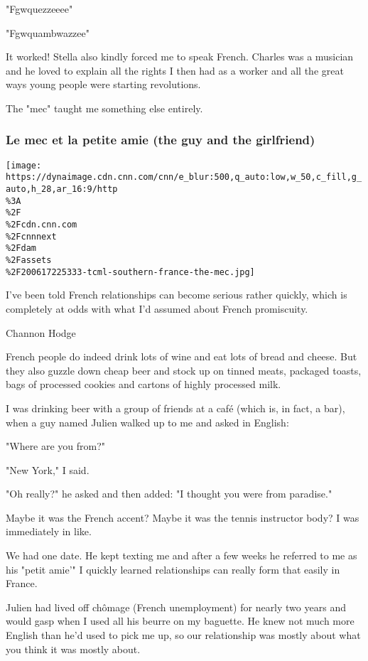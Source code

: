 "Fgwquezzeeee"

"Fgwquambwazzee"

It worked! Stella also kindly forced me to speak French. Charles was a
musician and he loved to explain all the rights I then had as a worker
and all the great ways young people were starting revolutions.

The "mec" taught me something else entirely.

\hypertarget{le-mec-et-la-petite-amie-the-guy-and-the-girlfriend}{%
\subsubsection{Le mec et la petite amie (the guy and the
girlfriend)}\label{le-mec-et-la-petite-amie-the-guy-and-the-girlfriend}}

\texttt{[image: https://dynaimage.cdn.cnn.com/cnn/e\_blur:500,q\_auto:low,w\_50,c\_fill,g\_auto,h\_28,ar\_16:9/http\\\%3A\\\%2F\\\%2Fcdn.cnn.com\\\%2Fcnnnext\\\%2Fdam\\\%2Fassets\\\%2F200617225333-tcml-southern-france-the-mec.jpg]}

I've been told French relationships can become serious rather quickly,
which is completely at odds with what I'd assumed about French
promiscuity.

Channon Hodge

French people do indeed drink lots of wine and eat lots of bread and
cheese. But they also guzzle down cheap beer and stock up on tinned
meats, packaged toasts, bags of processed cookies and cartons of highly
processed milk.

I was drinking beer with a group of friends at a café (which is, in
fact, a bar), when a guy named Julien walked up to me and asked in
English:

"Where are you from?"

"New York," I said.

"Oh really?" he asked and then added: "I thought you were from
paradise."

Maybe it was the French accent? Maybe it was the tennis instructor body?
I was immediately in like.

We had one date. He kept texting me and after a few weeks he referred to
me as his "petit amie'" I quickly learned relationships can really form
that easily in France.

Julien had lived off chômage (French unemployment) for nearly two years
and would gasp when I used all his beurre on my baguette. He knew not
much more English than he'd used to pick me up, so our relationship was
mostly about what you think it was mostly about.


